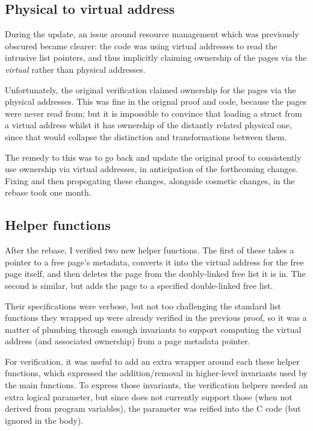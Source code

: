 \subsection{Physical to virtual address}

During the update, an issue around resource management which was previously
obscured became clearer: the code was using virtual addresses to read the
intrusive list pointers, and thus implicitly claiming ownership of the pages
via the \emph{virtual} rather than physical addresses.

Unfortunately, the original verification claimed ownership for the pages via
the physical addresses. This was fine in the orignal proof and code, because
the pages were never read from; but it is impossible to convince  that
loading a struct from a virtual address whilst it has ownership of the
distantly related physical one, since that would collapse the distinction and
transformations between them.

The remedy to this was to go back and update the original proof to consistently
use ownership via virtual addresses, in anticipation of the forthcoming
changes. Fixing and then propogating these changes, alongside cosmetic changes,
in the rebase took one month.

\subsection{Helper functions}

After the rebase, I verified two new helper functions. The first of these takes
a pointer to a free page's metadata, converts it into the virtual address for
the free page itself, and then deletes the page from the doubly-linked free
list it is in. The second is similar, but adds the page to a specified
double-linked free list.

Their specifications were verbose, but not too challenging \textemdash{} the
standard list functions they wrapped up were already verified in the previous
proof, so it was a matter of plumbing through enough invariants to support
computing the virtual address (and associated ownership) from a page metadata
pointer.

For verification, it was useful to add an extra wrapper around each these
helper functions, which expressed the addition/removal in higher-level
invariants used by the main functions. To express those invariants, the
verification helpers needed an extra logical parameter, but since
 does not currently support those (when not derived from program
variables), the parameter was reified into the C code (but ignored in the
body).

